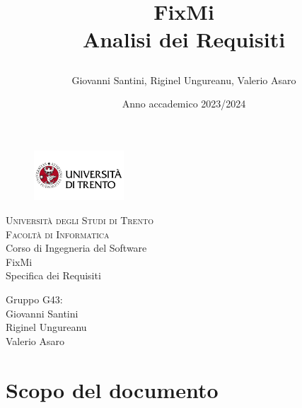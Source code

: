 \documentclass{report}
\title{

	FixMi \\
	Analisi dei Requisiti
}
\author{Giovanni Santini, Riginel Ungureanu, Valerio Asaro}
\date{Anno accademico 2023/2024}
\begin{document}
	
	
	\begin{titlepage}
		\begin{figure}[t]
			\centering\includegraphics[width=0.3\textwidth]{images/unitn-logo}
		\end{figure}
		\begin{center}
			\textsc{ \LARGE{Università degli Studi di Trento \\}}
			\textsc{ \LARGE{Facoltà di Informatica\\ }}
			\textnormal{ \LARGE{Corso di Ingegneria del Software\\}}
			\vspace{30mm}
			\fontsize{10mm}{7mm}\selectfont 
			\textup{FixMi \\ Specifica dei Requisiti}\\
		\end{center}
		
		\vspace{25mm}
		
		\centering
		\large Gruppo G43: \\ Giovanni Santini\\ Riginel Ungureanu \\ Valerio Asaro
		
		\vspace{20mm}
		
		
	\end{titlepage}
	
	
	
	
	\pagestyle{fancy}
	\fancyhead[R]{\chaptername\ \thechapter}  %
	
	\tableofcontents
	\newpage
	
	
	
	\section{Scopo del documento}
	
\end{document}
